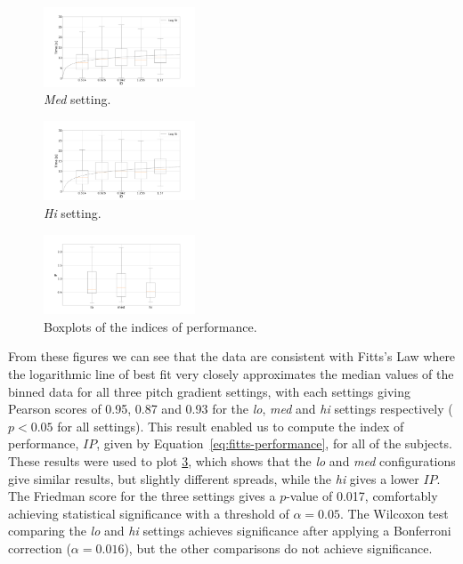 \documentclass[sigconf, review=true, screen=true, anonymous=true]{acmart}
\begin{document}
\begin{figure}
  \centering
  \includegraphics[clip, trim=120 20 120 20, width=0.4\textwidth]{figures/fitts_med.png}
  \caption{\emph{Med} setting. }
  \label{fig:fitts-med}
\end{figure}

\begin{figure}
  \centering
  \includegraphics[clip, trim=120 20 120 20, width=0.4\textwidth]{figures/fitts_hi.png}
  \caption{\emph{Hi} setting. }
  \label{fig:fitts-hi}
\end{figure}

\begin{figure}
  \centering
  \includegraphics[clip, trim=90 20 130 20, width=0.4\textwidth]{figures/fitts_performance.png}
  \caption{Boxplots of the indices of performance.}
  \label{fig:fitts-performance}
\end{figure}

From these figures we can see that the data are consistent with Fitts's Law where the logarithmic line of best fit very closely approximates the median values of the binned data for all three pitch gradient settings, with each settings giving Pearson scores of 0.95, 0.87 and 0.93 for the \emph{lo}, \emph{med} and \emph{hi} settings respectively ($p < 0.05$ for all settings). 
This result enabled us to compute the index of performance, $IP$, given by Equation~\ref{eq:fitts-performance}, for all of the subjects.
These results were used to plot \cref{fig:fitts-performance}, which shows that the \emph{lo} and \emph{med} configurations give similar results, but slightly different spreads, while the \emph{hi} gives a lower $IP$.
The Friedman score for the three settings gives a $p$-value of 0.017, comfortably achieving statistical significance with a threshold of $\alpha=0.05$.
The Wilcoxon test comparing the \emph{lo} and \emph{hi} settings achieves significance after applying a Bonferroni correction ($\alpha=0.016$), but the other comparisons do not achieve significance. 
\end{document}
